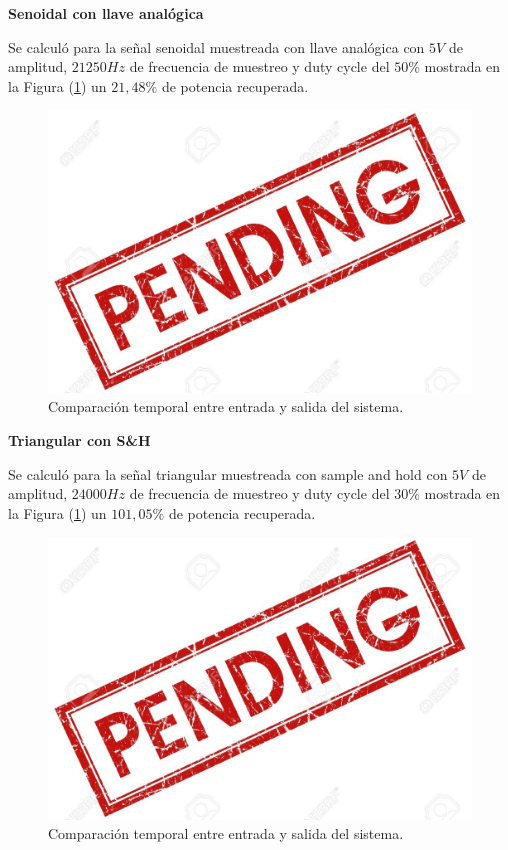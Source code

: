 \textbf{Senoidal con llave analógica}

Se calculó para la señal senoidal muestreada con llave analógica con $5V$ de amplitud, $21250Hz$ de frecuencia de muestreo y duty cycle del $50\%$ mostrada en la Figura (\ref{fig:senollave}) un $21,48\%$ de potencia recuperada. 

\begin{figure}[H]
\centering
\includegraphics[width=\textwidth]{ImagenesEjercicio6/pend.jpg}
\caption{Comparación temporal entre entrada y salida del sistema.}
\label{fig:senollave}
\end{figure}

\textbf{Triangular con S\&H}

Se calculó para la señal triangular muestreada con sample and hold con $5V$ de amplitud, $24000Hz$ de frecuencia de muestreo y duty cycle del $30\%$ mostrada en la Figura (\ref{fig:senollave}) un $101,05\%$ de potencia recuperada. 

\begin{figure}[H]
\centering
\includegraphics[width=\textwidth]{ImagenesEjercicio6/pend.jpg}
\caption{Comparación temporal entre entrada y salida del sistema.}
\end{figure}


